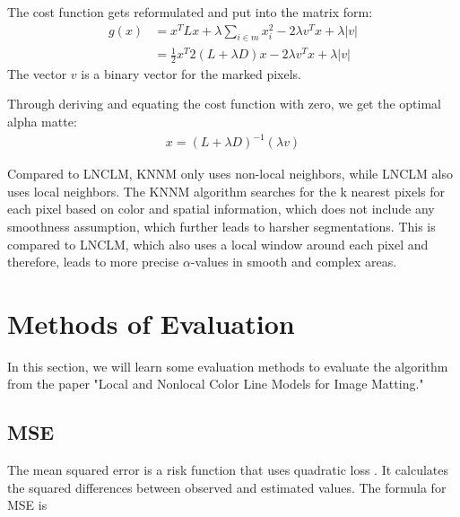 The cost function gets reformulated and put into the matrix form:
\begin{align}
	g(x) & = x^T L x + \lambda \sum_{i \in m} x_i^2 - 2 \lambda v^T x + \lambda |v|\\
	& = \frac{1}{2}x^T 2 (L + \lambda D) x - 2 \lambda v^T x + \lambda |v|
\end{align}
The vector \(v\) is a binary vector for the marked pixels.

Through deriving and equating the cost function with zero, we get the optimal alpha matte:
\begin{align}
	x = (L + \lambda D)^{-1}(\lambda v)
\end{align}

Compared to LNCLM, KNNM only uses non-local neighbors, while LNCLM also uses local neighbors. The KNNM algorithm searches for the k nearest pixels for each pixel based on color and spatial information, which does not include any smoothness assumption, which further leads to harsher segmentations. This is compared to LNCLM, which also uses a local window around each pixel and therefore, leads to more precise $\alpha$-values in smooth and complex areas. 






\section{Methods of Evaluation}
In this section, we will learn some evaluation methods to evaluate the algorithm from the paper "Local and Nonlocal Color Line Models for Image Matting." 

\subsection{MSE}
The mean squared error is a risk function that uses quadratic loss  \cite[p.\ 20]{mse}. It calculates the squared differences between observed and estimated values. The formula for MSE is 

